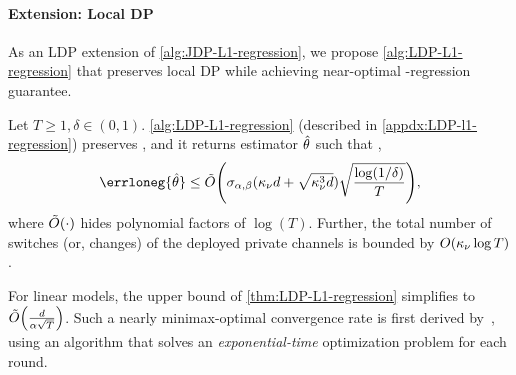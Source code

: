 \paragraph{Extension: Local DP}
As an LDP extension of \cref{alg:JDP-L1-regression}, we propose \cref{alg:LDP-L1-regression} that preserves local DP while achieving near-optimal \Lone-regression guarantee.
\begin{theorem}\label{thm:LDP-L1-regression}
Let $T\geq 1, \delta\in(0,1)$. \cref{alg:LDP-L1-regression} (described in \cref{appdx:LDP-l1-regression}) preserves \aLDP, and it returns estimator $\hat{\theta}$ such that \whp,
\begin{align*}
    \errloneg{\hth}
    \leq \tbO{\siga (\kpg d+\sqrt{\kpg^3d} ) \sqrt{\frac{\log(1/\delta)}{T}}},
\end{align*}
where $\tilde{O}{\left( \cdot \right)}$ hides polynomial factors of $\log(T)$.
Further, the total number of switches (or, changes) of the deployed private channels is bounded by $O{\left( \kappa_\nu \log T \right)}$.
\end{theorem}

For linear models, the upper bound of \cref{thm:LDP-L1-regression} simplifies to $\tilde{O}{\left( \frac{d}{\alpha\sqrt{T}} \right)}$. Such a nearly minimax-optimal convergence rate is first derived by~\citet{chen2024private}, using an algorithm that solves an \emph{exponential-time} optimization problem for each round.





